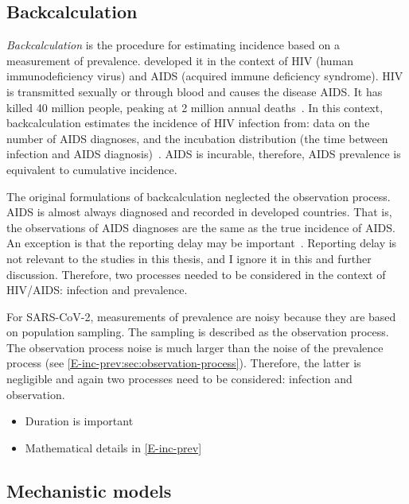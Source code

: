 \documentclass[thesis.tex]{subfiles}
\begin{document}
\subsection{Backcalculation}

\emph{Backcalculation} is the procedure for estimating incidence based on a measurement of prevalence.
\Textcite{brookmeyerMethod} developed it in the context of HIV (human immunodeficiency virus) and AIDS (acquired immune deficiency syndrome).
HIV is transmitted sexually or through blood and causes the disease AIDS.
It has killed 40 million people, peaking at 2 million annual deaths~\autocite{unaids2023}.
In this context, backcalculation estimates the incidence of HIV infection from: data on the number of AIDS diagnoses, and the incubation distribution (the time between infection and AIDS diagnosis)~\autocite{brookmeyerBackcalculation,brookmeyerMeasuring}.
AIDS is incurable, therefore, AIDS prevalence is equivalent to cumulative incidence.


The original formulations of backcalculation neglected the observation process.
AIDS is almost always diagnosed and recorded in developed countries.
That is, the observations of AIDS diagnoses are the same as the true incidence of AIDS.
An exception is that the reporting delay may be important~\autocite{paganoHIV}.
Reporting delay is not relevant to the studies in this thesis, and I ignore it in this and further discussion.
Therefore, two processes needed to be considered in the context of HIV/AIDS: infection and prevalence.

For SARS-CoV-2, measurements of prevalence are noisy because they are based on population sampling.
The sampling is described as the observation process.
The observation process noise is much larger than the noise of the prevalence process (see \cref{E-inc-prev:sec:observation-process}).
Therefore, the latter is negligible and again two processes need to be considered: infection and observation.

\begin{itemize}
    \item Duration is important
    \item Mathematical details in \cref{E-inc-prev}
\end{itemize}

\subsection{Mechanistic models}
\end{document}
